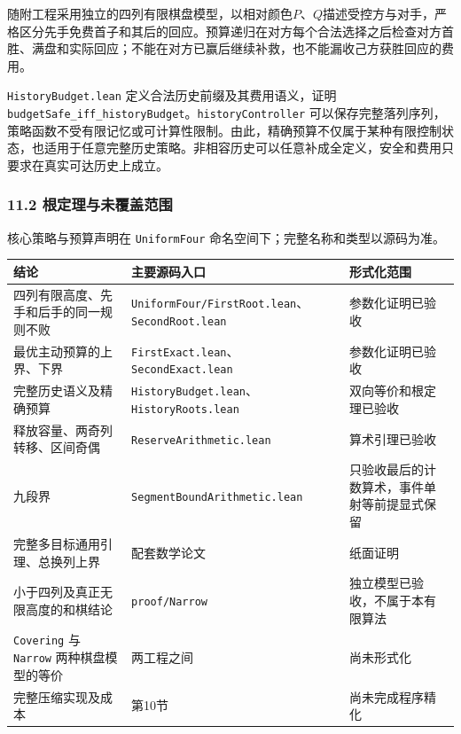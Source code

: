 \documentclass[
  a4paper,
]{article}
\newcounter{none} %
\begin{document}
随附工程采用独立的四列有限棋盘模型，以相对颜色\(P\)、\(Q\)描述受控方与对手，严格区分先手免费首子和其后的回应。预算递归在对方每个合法选择之后检查对方首胜、满盘和实际回应；不能在对方已赢后继续补救，也不能漏收己方获胜回应的费用。

\texttt{HistoryBudget.lean} 定义合法历史前缀及其费用语义，证明
\texttt{budgetSafe\_iff\_historyBudget}。\texttt{historyController}
可以保存完整落列序列，策略函数不受有限记忆或可计算性限制。由此，精确预算不仅属于某种有限控制状态，也适用于任意完整历史策略。非相容历史可以任意补成全定义，安全和费用只要求在真实可达历史上成立。

\subsubsection{11.2
根定理与未覆盖范围}\label{ux6839ux5b9aux7406ux4e0eux672aux8986ux76d6ux8303ux56f4}

核心策略与预算声明在 \texttt{UniformFour}
命名空间下；完整名称和类型以源码为准。

{\def\LTcaptype{none} %
\begin{longtable}[]{@{}
  >{\raggedright\arraybackslash}p{}
  >{\raggedright\arraybackslash}p{}
  >{\raggedright\arraybackslash}p{}@{}}
\toprule\noalign{}
\begin{minipage}[b]{\linewidth}\raggedright
结论
\end{minipage} & \begin{minipage}[b]{\linewidth}\raggedright
主要源码入口
\end{minipage} & \begin{minipage}[b]{\linewidth}\raggedright
形式化范围
\end{minipage} \\
\midrule\noalign{}
\endhead
\bottomrule\noalign{}
\endlastfoot
四列有限高度、先手和后手的同一规则不败 &
\texttt{UniformFour/FirstRoot.lean}、\texttt{SecondRoot.lean} &
参数化证明已验收 \\
最优主动预算的上界、下界 &
\texttt{FirstExact.lean}、\texttt{SecondExact.lean} &
参数化证明已验收 \\
完整历史语义及精确预算 &
\texttt{HistoryBudget.lean}、\texttt{HistoryRoots.lean} &
双向等价和根定理已验收 \\
释放容量、两奇列转移、区间奇偶 & \texttt{ReserveArithmetic.lean} &
算术引理已验收 \\
九段界 & \texttt{SegmentBoundArithmetic.lean} &
只验收最后的计数算术，事件单射等前提显式保留 \\
完整多目标通用引理、总换列上界 & 配套数学论文 & 纸面证明 \\
小于四列及真正无限高度的和棋结论 & \texttt{proof/Narrow} &
独立模型已验收，不属于本有限算法 \\
\texttt{Covering} 与 \texttt{Narrow} 两种棋盘模型的等价 & 两工程之间 &
尚未形式化 \\
完整压缩实现及成本 & 第10节 & 尚未完成程序精化 \\
\end{longtable}
}
\end{document}

